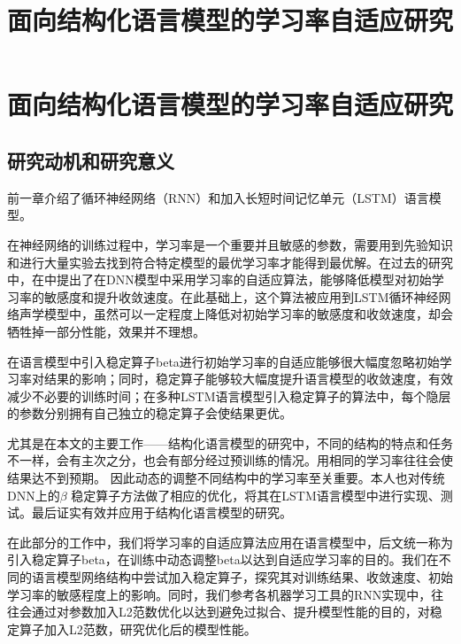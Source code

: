 

\chapter{面向结构化语言模型的学习率自适应研究}
\label{chap:beta}




\title{面向结构化语言模型的学习率自适应研究}

\section{研究动机和研究意义}
前一章介绍了循环神经网络（RNN）和加入长短时间记忆单元（LSTM）语言模型。

在神经网络的训练过程中，学习率是一个重要并且敏感的参数，需要用到先验知识和进行大量实验去找到符合特定模型的最优学习率才能得到最优解。在过去的研究中，在\cite{ghahremani2016self}中提出了在DNN模型中采用学习率的自适应算法，能够降低模型对初始学习率的敏感度和提升收敛速度。在此基础上，这个算法被应用到LSTM循环神经网络声学模型中\cite{liu2016investigation}，虽然可以一定程度上降低对初始学习率的敏感度和收敛速度，却会牺牲掉一部分性能，效果并不理想。

在语言模型中引入稳定算子beta进行初始学习率的自适应能够很大幅度忽略初始学习率对结果的影响；同时，稳定算子能够较大幅度提升语言模型的收敛速度，有效减少不必要的训练时间；在多种LSTM语言模型引入稳定算子的算法中，每个隐层的参数分别拥有自己独立的稳定算子会使结果更优。

尤其是在本文的主要工作——结构化语言模型的研究中，不同的结构的特点和任务不一样，会有主次之分，也会有部分经过预训练的情况。用相同的学习率往往会使结果达不到预期。
因此动态的调整不同结构中的学习率至关重要。本人也对传统DNN上的$\beta$	稳定算子方法做了相应的优化，将其在LSTM语言模型中进行实现、测试。最后证实有效并应用于结构化语言模型的研究。

在此部分的工作中，我们将学习率的自适应算法应用在语言模型中，后文统一称为引入稳定算子beta，在训练中动态调整beta以达到自适应学习率的目的。我们在不同的语言模型网络结构中尝试加入稳定算子，探究其对训练结果、收敛速度、初始学习率的敏感程度上的影响。同时，我们参考各机器学习工具的RNN实现中，往往会通过对参数加入L2范数优化以达到避免过拟合、提升模型性能的目的，对稳定算子加入L2范数，研究优化后的模型性能。


